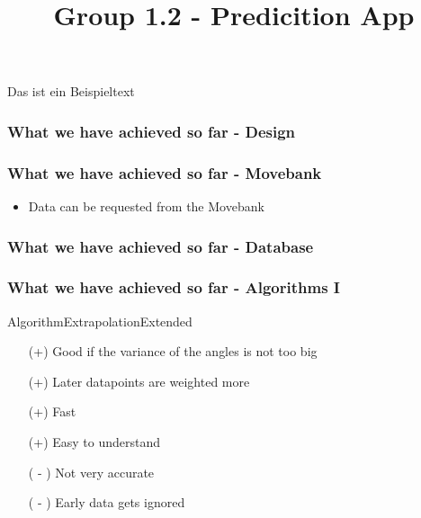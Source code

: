 \documentclass{beamer}
\title[] {Group 1.2 - Predicition App}
\date{} %
\begin{document}
Das ist ein Beispieltext
\frame{\titlepage}

\begin{frame}
	\frametitle{What we have achieved so far - Design}
    


\end{frame}




\begin{frame}
	\frametitle{What we have achieved so far - Movebank}
    
	\begin{itemize}
		\item Data can be requested from the Movebank
		
	\end{itemize}
    
\end{frame}





\begin{frame}
	\frametitle{What we have achieved so far - Database}
    

    
\end{frame}





\begin{frame}
	\frametitle{What we have achieved so far - Algorithms I}
	\Large{AlgorithmExtrapolationExtended}
	\normalsize{}
			\begin{itemize}
				\item[(+)] Good if the variance of the angles is not too big
				\item[(+)] Later datapoints are weighted more
				\item[(+)] Fast
				\item[(+)] Easy to understand
				\item[] 
				\item[( - )] Not very accurate
				\item[( - )] Early data gets ignored

			\end{itemize}
\end{frame}
\end{document}
